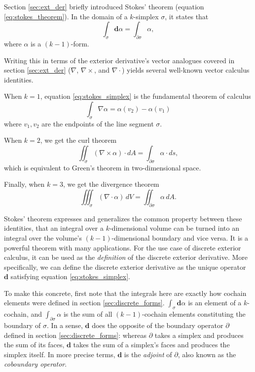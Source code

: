 \documentclass[utf8,english]{gradu3}
\begin{document}
Section \ref{sec:ext_der} briefly introduced Stokes' theorem
(equation \ref{eq:stokes_theorem}).
In the domain of a $k$-simplex $\sigma$, it states that
\begin{equation}\label{eq:stokes_simplex}
  \int_{\sigma} \mathbf{d}\alpha = \int_{\partial\sigma} \alpha,
\end{equation}
where $\alpha$ is a $(k-1)$-form.

Writing this in terms of the exterior derivative's
vector analogues covered in section \ref{sec:ext_der}
($\nabla$, $\nabla \times$, and $\nabla \cdot$)
yields several well-known vector calculus identities.

When $k = 1$, equation \ref{eq:stokes_simplex}
is the fundamental theorem of calculus
\begin{equation}\label{eq:fund_theorem_calc}
  \int_{\sigma} \nabla \alpha = \alpha(v_2) - \alpha(v_1)
\end{equation}
where $v_1,v_2$ are the endpoints of the line segment $\sigma$.

When $k = 2$, we get the curl theorem
\begin{equation}\label{eq:curl_theorem}
  \iint_{\sigma} (\nabla \times \alpha) \cdot dA = \int_{\partial\sigma} \alpha \cdot ds,
\end{equation}
which is equivalent to Green's theorem in two-dimensional space.

Finally, when $k = 3$, we get the divergence theorem
\begin{equation}\label{eq:divergence_theorem}
  \iiint_{\sigma} (\nabla \cdot \alpha) \,dV = \iint_{\partial\sigma} \alpha \,dA.
\end{equation}

Stokes' theorem expresses and generalizes the common property between these identities,
that an integral over a $k$-dimensional volume
can be turned into an integral over the volume's
$(k-1)$-dimensional boundary and vice versa.
It is a powerful theorem with many applications.
For the use case of discrete exterior calculus,
it can be used as the \textit{definition} of
the discrete exterior derivative.
More specifically, we can define the discrete exterior derivative
as the unique operator $\mathbf{d}$ satisfying equation \ref{eq:stokes_simplex}.

To make this concrete, first note that the integrals here
are exactly how cochain elements were defined in section \ref{sec:discrete_forms}.
$\int_{\sigma} \mathbf{d}\alpha$ is an element of a $k$-cochain,
and $\int_{\partial\sigma} \alpha$ is the sum of all $(k-1)$-cochain elements
constituting the boundary of $\sigma$.
In a sense, $\mathbf{d}$ does the opposite of the boundary operator $\partial$
defined in section \ref{sec:discrete_forms}:
whereas $\partial$ takes a simplex and produces the sum of its faces,
$\mathbf{d}$ takes the sum of a simplex's faces and produces the simplex itself.
In more precise terms, $\mathbf{d}$ is the \textit{adjoint} of $\partial$,
also known as the \textit{coboundary operator}.
\end{document}
